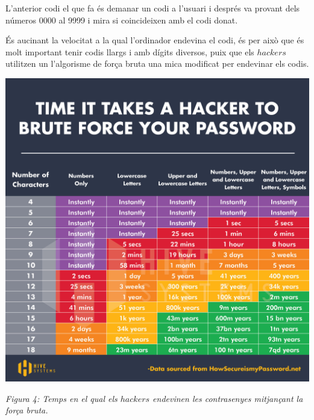 \newpage

L'anterior codi el que fa és demanar un codi a l'usuari i després va provant dels números 0000 al 9999 i mira si coincideixen amb el codi donat.

És a\lgem ucinant la velocitat a la qual l'ordinador endevina el codi, és per això que és molt important tenir codis llargs i amb dígits diversos, puix que els $hackers$ utilitzen un l'algorisme de força bruta una mica modificat per endevinar els codis. \newline

\begin{center}
\includegraphics[width=.7 \textwidth]{time_hackers.jpg}

\caption{\emph{Figura 4: Temps en el qual els $hackers$ endevinen les contrasenyes mitjançant la força bruta.}}
\end{center}